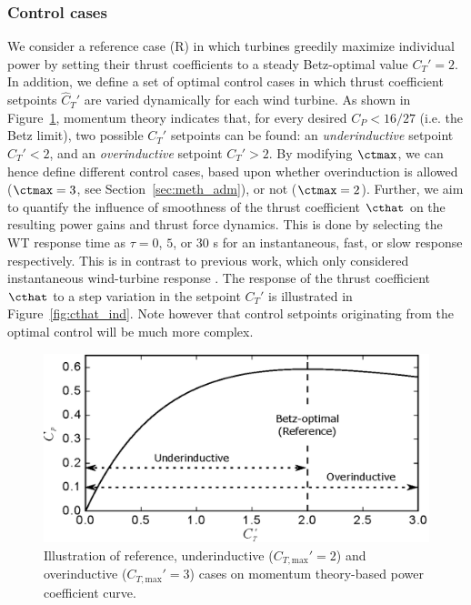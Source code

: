 \subsubsection{Control cases}

We consider a reference case (R) in which turbines greedily maximize individual power by setting their thrust coefficients to a steady Betz-optimal value $C_T' = 2$.  In addition, we define a set of optimal control cases in which thrust coefficient setpoints $\widehat{C}_T'$ are varied dynamically for each wind turbine. As shown in Figure~\ref{fig:under_overinductive}, momentum theory indicates that, for every desired $C_P < 16/27$ (i.e. the Betz limit), two possible $C_T'$ setpoints can be found: an \emph{underinductive} setpoint $C_T' < 2$, and an \emph{overinductive} setpoint $C_T' > 2$. By modifying $\ctmax$, we can hence define different control cases, based upon whether overinduction is allowed ($\ctmax = 3$, see Section~\ref{sec:meth_adm}), or not ($\ctmax = 2$). Further, we aim to quantify the influence of smoothness of the thrust coefficient $\cthat$ on the resulting power gains and thrust force dynamics. This is done by selecting the WT response time as $\tau = 0$, $5$, or $30$ s for an instantaneous, fast, or slow response respectively. This is in contrast to previous work, which only considered instantaneous wind-turbine response \citep{goit2015optimal,goit2016optimal}. The response of the thrust coefficient $\cthat$ to a step variation in the setpoint $C_T'$ is illustrated in Figure~\ref{fig:cthat_ind}. Note however that control setpoints originating from the optimal control will be much more complex.  

\begin{figure}[t]
	\centering
	\includegraphics[width=\linewidth]{figures/meth_ct_ctprime_cp2.eps}
	\caption{Illustration of reference, underinductive ($C_{T,\text{max}}' = 2$) and overinductive ($C_{T,\text{max}}' = 3$) cases on momentum theory-based power coefficient curve.\label{fig:under_overinductive}}
\end{figure}

